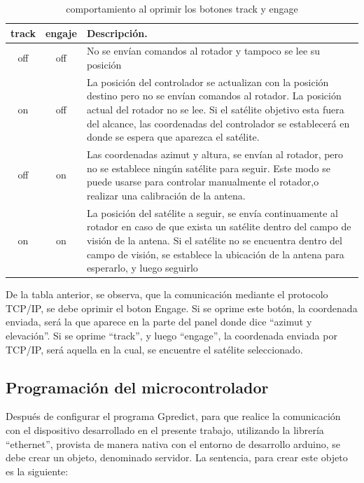 \begin{table}[h!]
	\begin{tabular}{|c|c|p{11.0cm}|}
		\hline 
		track & engaje & Descripción. \\
		\hline 
		off & off  & No se envían comandos al rotador y tampoco se lee su posición \\ 
		\hline 
		on  & off  &   La posición del controlador se actualizan con la posición destino pero no se envían comandos al rotador. La posición actual del rotador no se lee. Si el satélite objetivo esta fuera del alcance, las coordenadas del controlador se establecerá en donde se espera que aparezca el satélite. \\
		\hline 
		off & on  &   Las coordenadas azimut y altura, se envían al rotador, pero no se establece ningún satélite para seguir.  Este modo se puede usarse para controlar manualmente el rotador,o realizar una calibración de la antena. \\ 
		\hline 
		on  & on   &La posición del satélite a seguir, se envía continuamente al rotador en caso de que exista un satélite dentro del campo de visión de la antena. Si el satélite no se encuentra dentro del campo de visión, se establece la ubicación de la antena para esperarlo, y luego seguirlo \\
		\hline 
				
	\end{tabular}
	\caption{comportamiento al oprimir los botones track y engage}
\end{table}

De la tabla anterior, se observa, que la comunicación mediante el protocolo TCP/IP, se debe oprimir el boton Engage. Si se oprime este botón, la coordenada enviada, será la que aparece en la parte del panel donde dice ``azimut y elevación''. Si se oprime ``track'', y luego ``engage'', la coordenada enviada por TCP/IP, será aquella en la cual, se encuentre el satélite seleccionado. 

\subsection{Programación del microcontrolador} 

Después de configurar el programa Gpredict, para que realice la comunicación con el dispositivo desarrollado en el presente trabajo, utilizando la librería ``ethernet'', provista de manera nativa con el entorno de desarrollo arduino, se debe crear un objeto, denominado servidor. La sentencia, para crear este objeto es la siguiente: 

